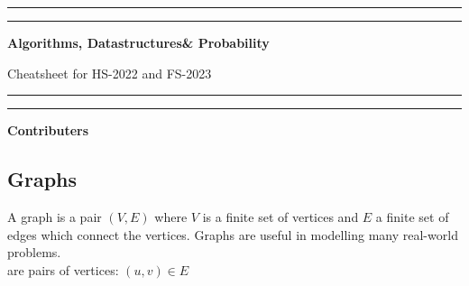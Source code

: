 \documentclass[a3paper, landscape, 11pt]{article} %
\begin{document}
\begin{multicols*}{4}{
\author{
	Louis Schell
}


\rule{\columnwidth}{0.4pt}\vspace*{-\baselineskip}\vspace{3.2pt} %
	\rule{\columnwidth}{1.6pt} %
\begin{center}
\textbf{\huge{Algorithms, Datastructures{\color{black!0}{,}}\& Probability}}

\vspace{12pt}
Cheatsheet for HS-2022 and FS-2023
\rule{\columnwidth}{0.4pt}\vspace*{-\baselineskip}\vspace{3.2pt} %
	\rule{\columnwidth}{1.6pt} %


\bigskip
\license

\vfill

{\large{\textbf{Contributers}}}

\smallskip

\theauthor

\end{center}












\newpage
{}
\subsection*{Graphs}
A graph is a pair $(V,E)$ where $V$ is a finite set of vertices and $E$ a finite set of edges which connect the vertices. Graphs are useful in modelling many real-world problems.\\

 are pairs of vertices: $(u,v) \in E$\\

}
\end{multicols*}
\end{document}
